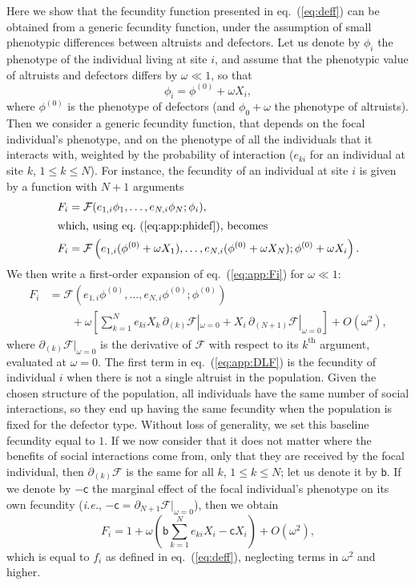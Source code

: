 \documentclass[11pt, letterpaper]{article}
\renewcommand{\eqref}[1]{\textup{{\normalfont eq.~(\ref{#1}}\normalfont)}}
\newcommand{\ie}{\textit{i.e.}}
\newcommand{\bigO}[1]{O\left( #1 \right)}
\newcommand{\bb}{\mathsf{b}}
\newcommand{\cc}{\mathsf{c}}
\begin{document}
Here we show that the fecundity function presented in \eqref{eq:deff} can be obtained from a generic fecundity function, under the assumption of small phenotypic differences between altruists and defectors. Let us denote by $\phi_i$ the phenotype of the individual living at site $i$, and assume that the phenotypic value of altruists and defectors differs by $\omega\ll 1$, so that 
\begin{equation}\label{eq:app:phidef}
\phi_i = \phi^{(0)} + \omega X_i,
\end{equation}
where $\phi^{(0)}$ is the phenotype of defectors (and $\phi_0 + \omega$ the phenotype of altruists). Then we consider a generic fecundity function, that depends on the focal individual's phenotype, and on the phenotype of all the individuals that it interacts with, weighted by the probability of interaction ($e_{ki}$ for an individual at site $k$, $1\leq k\leq N$). For instance, the fecundity of an individual at site $i$ is given by a function with $N+1$ arguments
\begin{align}
F_i &= \mathcal{F}(e_{1,i} \phi_1, \dots, e_{N,i} \phi_N; \phi_i) \nonumber , \\
\intertext{which, using \eqref{eq:app:phidef}, becomes}
F_i & = \mathcal{F}\left(e_{1,i} (\phi^{(0)} + \omega X_1), \dots, e_{N,i} (\phi^{(0)} + \omega X_N); \phi^{(0)} + \omega X_i\right). \label{eq:app:Fi}
\end{align} 
%
We then write a first-order expansion of \eqref{eq:app:Fi} for $\omega \ll 1$:
\begin{align}\label{eq:app:DLF}
F_i & = \mathcal{F}\left(e_{1,i} \phi^{(0)}, \dots, e_{N,i} \phi^{(0)}; \phi^{(0)} \right) \nonumber \\
& \qquad + \omega \left[ \sum_{k=1}^N e_{ki} X_k \, \partial_{(k)}\mathcal{F}|_{\omega=0}  + X_i \, \partial_{(N+1)}\mathcal{F}|_{\omega=0} \right] + \bigO{\omega^2}, 
\end{align}
where $\partial_{(k)}\mathcal{F}|_{\omega=0}$ is the derivative of $\mathcal{F}$ with respect to its $k^{\textrm{th}}$ argument, evaluated at $\omega=0$. The first term in \eqref{eq:app:DLF} is the fecundity of individual $i$ when there is not a single altruist in the population. Given the chosen structure of the population, all individuals have the same number of social interactions, so they end up having the same fecundity when the population is fixed for the defector type. Without loss of generality, we set this baseline fecundity equal to $1$. If we now consider that it does not matter where the benefits of social interactions come from, only that they are received by the focal individual, then $\partial_{(k)} \mathcal{F}$ is the same for all $k$, $1\leq k \leq N$; let us denote it by $\bb$. If we denote by $-\cc$ the marginal effect of the focal individual's phenotype on its own fecundity (\ie, $-\cc = \partial_{N+1}\mathcal{F}|_{\omega = 0}$), then we obtain
\begin{equation}
F_i = 1 + \omega \left(\bb \sum_{k=1}^N e_{ki} X_i - \cc X_i \right) + \bigO{\omega^2}, 
\end{equation}
which is equal to $f_i$ as defined in \eqref{eq:deff}, neglecting terms in $\omega^2$ and higher. 
\end{document}
